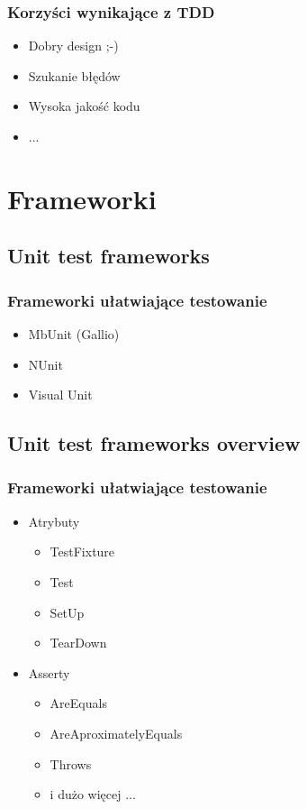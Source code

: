 \documentclass[slidestop,compress,mathserif]{beamer}
\begin{document}
\begin{frame}
 \frametitle{Korzyści wynikające z TDD}
 \begin{itemize}
 \item Dobry design ;-) %
 \pause \item Szukanie błędów
 \pause \item Wysoka jakość kodu
 \pause \item ...
 \end{itemize}
\end{frame}

\section{Frameworki}
\subsection{Unit test frameworks}
\begin{frame}
	\frametitle{Frameworki ułatwiające testowanie}
	\begin{itemize}
		\item{MbUnit (Gallio)}
		\pause \item{NUnit}
		\pause \item{Visual Unit}
	\end{itemize}
\end{frame}

\subsection{Unit test frameworks overview}
\begin{frame}
	\frametitle{Frameworki ułatwiające testowanie}
	\begin{itemize}
		\item{Atrybuty}
			\begin{itemize}
				\pause \item{TestFixture}
				\pause \item{Test}
				\pause \item{SetUp}
				\pause \item{TearDown}
			\end{itemize}
		\pause \item{Asserty}
			\begin{itemize}
				\pause \item{AreEquals}
				\pause \item{AreAproximatelyEquals}
				\pause \item{Throws}
				\pause \item{i dużo więcej ...}
			\end{itemize}
	\end{itemize}
\end{frame}
	
\end{document}
